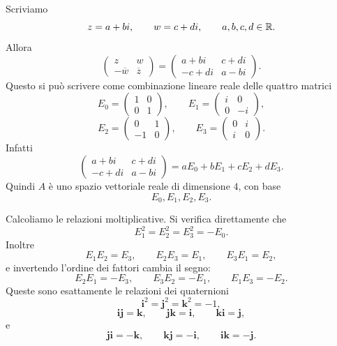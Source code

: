 \documentclass[a4paper]{article}
\begin{document}
\begin{radioactive}
\begin{snippetsolution}{}
    Scriviamo
    \[
        z=a+bi,
        \qquad
        w=c+di,
        \qquad
        a,b,c,d\in\mathbb{R}.
    \]
    Allora
    \[
        \begin{pmatrix}
            z & w\\
            -\overline{w} & \overline{z}
        \end{pmatrix}
        =
        \begin{pmatrix}
            a+bi & c+di\\
            -c+di & a-bi
        \end{pmatrix}.
    \]
    Questo si può scrivere come combinazione lineare reale delle quattro matrici
    \[
        E_0=
        \begin{pmatrix}
            1 & 0\\
            0 & 1
        \end{pmatrix},
        \qquad
        E_1=
        \begin{pmatrix}
            i & 0\\
            0 & -i
        \end{pmatrix},
    \]
    \[
        E_2=
        \begin{pmatrix}
            0 & 1\\
            -1 & 0
        \end{pmatrix},
        \qquad
        E_3=
        \begin{pmatrix}
            0 & i\\
            i & 0
        \end{pmatrix}.
    \]
    Infatti
    \[
        \begin{pmatrix}
            a+bi & c+di\\
            -c+di & a-bi
        \end{pmatrix}
        =
        aE_0+bE_1+cE_2+dE_3.
    \]
    Quindi \(A\) è uno spazio vettoriale reale di dimensione \(4\), con base
    \[
        E_0,E_1,E_2,E_3.
    \]

    Calcoliamo le relazioni moltiplicative. Si verifica direttamente che
    \[
        E_1^2=E_2^2=E_3^2=-E_0.
    \]
    Inoltre
    \[
        E_1E_2=E_3,
        \qquad
        E_2E_3=E_1,
        \qquad
        E_3E_1=E_2,
    \]
    e invertendo l'ordine dei fattori cambia il segno:
    \[
        E_2E_1=-E_3,
        \qquad
        E_3E_2=-E_1,
        \qquad
        E_1E_3=-E_2.
    \]
    Queste sono esattamente le relazioni dei quaternioni
    \[
        \mathbf{i}^2=\mathbf{j}^2=\mathbf{k}^2=-1,
    \]
    \[
        \mathbf{i}\mathbf{j}=\mathbf{k},
        \qquad
        \mathbf{j}\mathbf{k}=\mathbf{i},
        \qquad
        \mathbf{k}\mathbf{i}=\mathbf{j},
    \]
    e
    \[
        \mathbf{j}\mathbf{i}=-\mathbf{k},
        \qquad
        \mathbf{k}\mathbf{j}=-\mathbf{i},
        \qquad
        \mathbf{i}\mathbf{k}=-\mathbf{j}.
    \]


\end{snippetsolution}
\end{radioactive}
\end{document}
